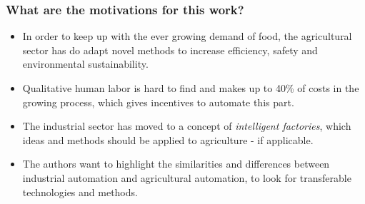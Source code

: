     \subsubsection*{What are the motivations for this work?}
    \begin{itemize}
        \item In order to keep up with the ever growing demand of food, the agricultural sector has do adapt novel methods to increase efficiency, safety and environmental sustainability.
        \item Qualitative human labor is hard to find and makes up to 40\% of costs in the growing process, which gives incentives to automate this part.
        \item The industrial sector has moved to a concept of \emph{intelligent factories}, which ideas and methods should be applied to agriculture - if applicable.
        \item The authors want to highlight the similarities and differences between industrial automation and agricultural automation, to look for transferable technologies and methods.\end{itemize}
